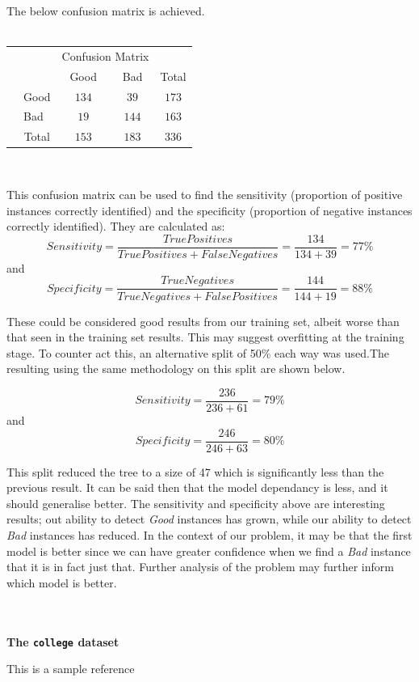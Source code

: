 \documentclass[paper=a4, fontsize=11pt]{scrartcl} %
\begin{document}
{\par \noindent The below confusion matrix is achieved. \\\\
\begin{tabular}{l|l|c|c|c}
\multicolumn{2}{c}{}&\multicolumn{2}{c}{Confusion Matrix}&\\
\cline{3-4}
\multicolumn{2}{c|}{}&Good&Bad&\multicolumn{1}{c}{Total}\\
\cline{2-4}
\multirow{2}{*}{}& Good & $134$ & $39$ & $173$\\
\cline{2-4}
& Bad & $19$ & $144$ & $163$\\
\cline{2-4}
\multicolumn{1}{c}{} & \multicolumn{1}{c}{Total} & \multicolumn{1}{c}{$153$} & \multicolumn{    1}{c}{$183$} & \multicolumn{1}{c}{$336$}\\
\end{tabular}\\
}
\par {This confusion matrix can be used to find the sensitivity (proportion of positive instances correctly identified) and the specificity (proportion of negative instances correctly identified). They are calculated as: 
\begin{equation}
Sensitivity =  \frac{True Positives }{True Positives + False Negatives} =\frac{134}{134 + 39} = 77\%
\end{equation}
{and}
\begin{equation}
Specificity =  \frac{True Negatives }{True Negatives + False Positives} =\frac{144}{144 + 19} = 88\%
\end{equation}
\clearpage
{\par These could be considered good results from our training set, albeit worse than that seen in the training set results. This may suggest overfitting at the training stage. To counter act this, an alternative split of 50\% each way was used.The resulting using the same methodology on this split are shown below. }
\begin{equation}
Sensitivity = \frac{236}{236 + 61} = 79\%
\end{equation}
{and}
\begin{equation}
Specificity =\frac{246}{246 + 63} = 80\%
\end{equation}}
{\par This split reduced the tree to a size of 47 which is significantly less than the previous result. It can be said then that the model dependancy is less, and it should generalise better. The sensitivity and specificity above are interesting results; out ability to detect {\it Good} instances has grown, while our ability to detect {\it Bad} instances has reduced. In the context of our problem, it may be that the first model is better since we can have greater confidence when we find a {\it Bad} instance that it is in fact just that. Further analysis of the problem may further inform which model is better.}\\\\
{\noindent \bf \Large The \texttt{college} dataset}
\clearpage
\begin{thebibliography}{9}

  This is a sample reference

\end{thebibliography}
\end{document}

